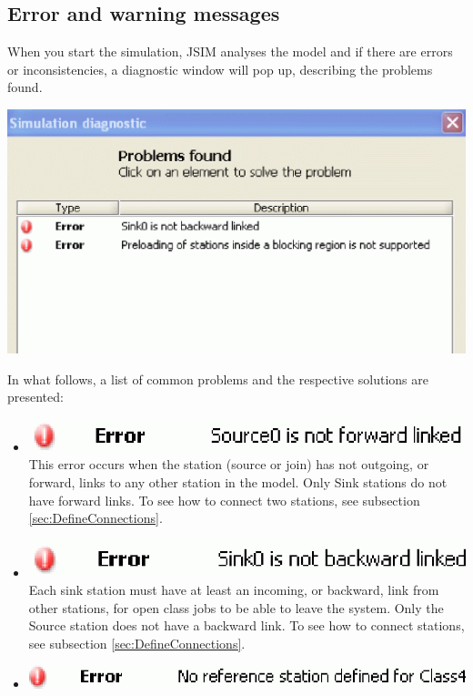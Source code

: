 \begin{description*}
\section{Error and warning messages}
\label{sec:ErrorAndWarningMessages}
When you start the simulation, JSIM analyses the model and if there are errors or inconsistencies, a diagnostic window will pop up, describing the problems found.
\begin{center}
\includegraphics[scale=.5]{img/jsim/error_window.eps}
\end{center}
In what follows, a list of common problems and the respective solutions are presented:
\begin{itemize}	
\item \includegraphics[scale=.5]{img/jsim/1.eps}\\
This error occurs when the station (source or join) has not outgoing, or forward, links to any other station in the model. Only Sink stations do not have forward links. 
To see how to connect two stations, see subsection \ref{sec:DefineConnections}.
\item \includegraphics[scale=.5]{img/jsim/2.eps}\\
Each sink station must have at least an incoming, or backward, link from other stations, for open class jobs to be able to leave the system. Only the Source station does not have a backward link. To see how to connect stations, see subsection \ref{sec:DefineConnections}.
\item \includegraphics[scale=.5]{img/jsim/3.eps}\\

\end{itemize}
\end{description*}
